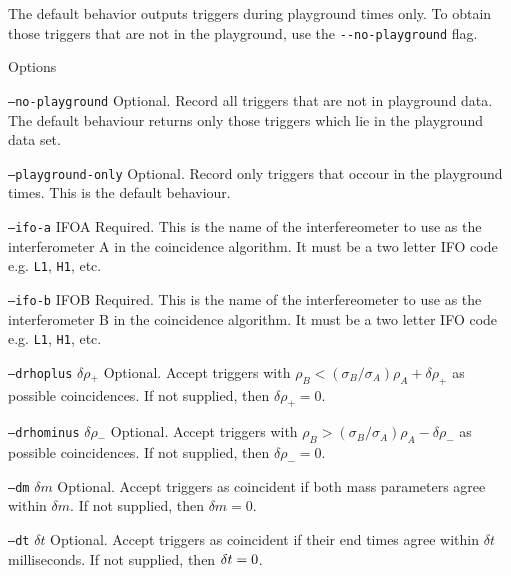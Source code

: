 \begin{entry}
The default behavior outputs triggers during playground times only. To obtain
those triggers that are not in the playground, use the \verb$--no-playground$
flag.     

\item[Options]\leavevmode
\begin{entry}
\item[\texttt{--no-playground}] Optional.  Record all triggers that are
not in playground data.  The default behaviour returns only those triggers
which lie in the playground data set.  

\item[\texttt{--playground-only}] Optional.  Record only triggers that
occour in the playground times.  This is the default behaviour.

\item[\texttt{--ifo-a} \textsc{IFOA}] Required. This is the name of the
interfereometer to use as the interferometer A in the coincidence algorithm.
It must be a two letter IFO code e.g. \texttt{L1}, \texttt{H1}, etc.

\item[\texttt{--ifo-b} \textsc{IFOB}] Required. This is the name of the
interfereometer to use as the interferometer B in the coincidence algorithm.
It must be a two letter IFO code e.g. \texttt{L1}, \texttt{H1}, etc.

\item[\texttt{--drhoplus} \textsc{$\delta\rho_+$}] Optional. Accept triggers
with $\rho_B < (\sigma_B/\sigma_A) \rho_A + \delta\rho_+$ as possible
coincidences.  If not supplied,  then $\delta\rho_+ = 0$.

\item[\texttt{--drhominus} \textsc{$\delta\rho_-$}] Optional. Accept triggers
with $\rho_B > (\sigma_B/\sigma_A) \rho_A - \delta\rho_-$ as possible
coincidences.  If not supplied,  then $\delta\rho_- = 0$.

\item[\texttt{--dm} \textsc{$\delta m$}] Optional. Accept triggers as
coincident if both mass parameters agree within $\delta m$.  If not
supplied,  then $\delta m = 0$.

\item[\texttt{--dt} \textsc{$\delta t$}] Optional. Accept triggers as
coincident if their end times agree within $\delta t$ milliseconds.  If not
supplied,  then $\textsc{$\delta t$} = 0$.


\end{entry}
\end{entry}

